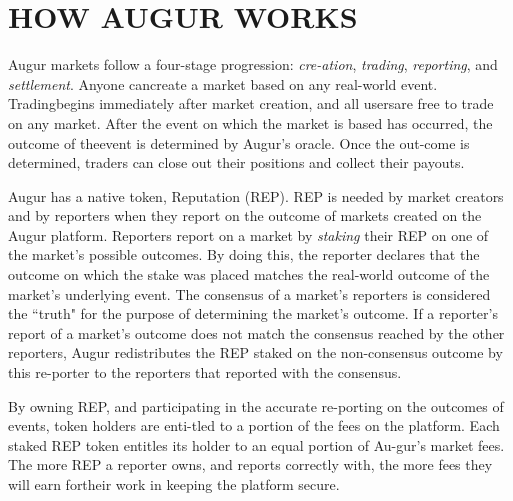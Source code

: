 \documentclass[12pt,floatfix,reprint,nofootinbib,amsmath,amssymb,epsfig,pre,floats,letterpaper,groupedaffiliation]{revtex4-1}
\theoremstyle{definition}
\theoremstyle{definition}
\begin{document}
\section{HOW AUGUR WORKS}

\vspace{0pt plus 20pt}

Augur markets follow a four-stage progression: \textit{cre-\linebreak ation}, \textit{trading}, \textit{reporting}, and \textit{settlement}. Anyone can\linebreak create a market based on any real-world event. Trading\linebreak begins immediately after market creation, and all users\linebreak are free to trade on any market. After the event on which the market is based has occurred, the outcome of the\linebreak event is determined by Augur's oracle. Once the out-\linebreak come is determined, traders can close out their positions and collect their payouts.

\vspace{0pt plus 20pt}

Augur has a native token, Reputation (REP). REP is needed by market creators and by reporters when they report on the outcome of markets created on the Augur platform. Reporters report on a market by \textit{staking} their REP on one of the market's possible outcomes. By doing this, the reporter declares that the outcome on which the stake was placed matches the real-world outcome of the market's underlying event. The consensus of a market's reporters is considered the ``truth" for the purpose of determining the market's outcome. If a reporter's report of a market's outcome does not match the consensus reached by the other reporters, Augur redistributes the REP staked on the non-consensus outcome by this re-\linebreak porter to the reporters that reported with the consensus.

\vspace{0pt plus 20pt}

By owning REP, and participating in the accurate re-\linebreak porting on the outcomes of events, token holders are enti-\linebreak tled to a portion of the fees on the platform. Each staked REP token entitles its holder to an equal portion of Au-\linebreak gur's market fees. The more REP a reporter owns, and reports correctly with, the more fees they will earn for\linebreak their work in keeping the platform secure.
\end{document}

